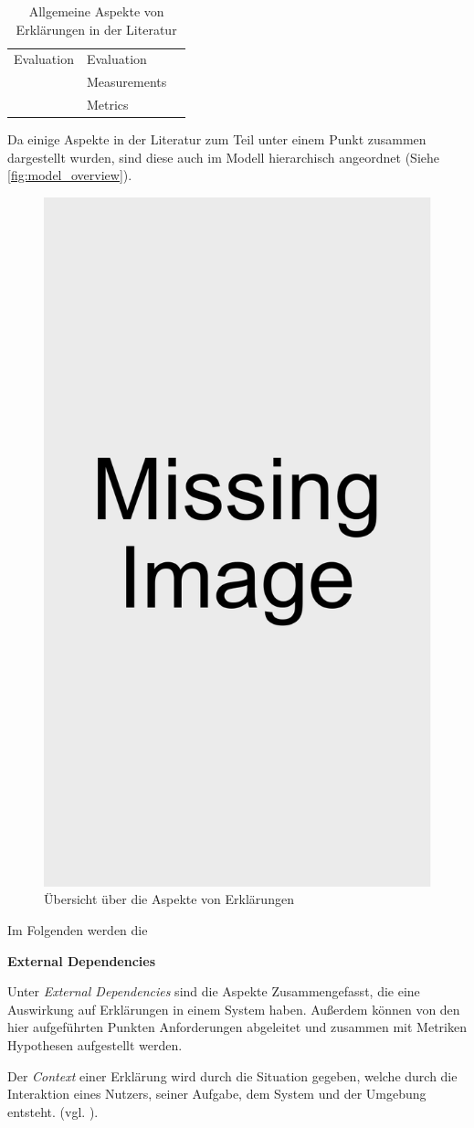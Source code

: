 \begin{table}
\begin{center}
\begin{tabular}{|p{}|p{}|p{}|}
            \hline
            Evaluation      & Evaluation    & \cite{kohl_explainability_2019} \cite{doshi2017towards} \\
                            & Measurements  & \cite{waa_evaluating_2021} \cite{balog_measuring_2020} \\
                            & Metrics       & \cite{nunes_systematic_2017} \cite{anjomshoae2019explainable} \cite{chari_explanation_2020} \cite{waa_evaluating_2021}\\
            \hline
        \end{tabular}
    \end{center}
    \caption{Allgemeine Aspekte von Erklärungen in der Literatur}
    \label{tab:model_explaination_aspects}
\end{table}

Da einige Aspekte in der Literatur zum Teil unter einem Punkt zusammen dargestellt wurden, sind diese auch im Modell hierarchisch angeordnet (Siehe \autoref{fig:model_overview}).

\begin{figure}
    \includegraphics[width=0.2\linewidth]{contents/res/missing_image.pdf}
    \caption{Übersicht über die Aspekte von Erklärungen}
    \label{fig:model_overview}
\end{figure}

\smallbreak

Im Folgenden werden die 

\textbf{External Dependencies}

Unter \textit{External Dependencies} sind die Aspekte Zusammengefasst, die eine Auswirkung auf Erklärungen in einem System haben. Außerdem können von den hier aufgeführten Punkten Anforderungen abgeleitet und zusammen mit Metriken Hypothesen aufgestellt werden.

Der \textit{Context} einer Erklärung wird durch die Situation gegeben, welche durch die Interaktion eines Nutzers, seiner Aufgabe, dem System und der Umgebung entsteht. (vgl. \cite{chazette_knowledge_nodate, kohl_explainability_2019}).

